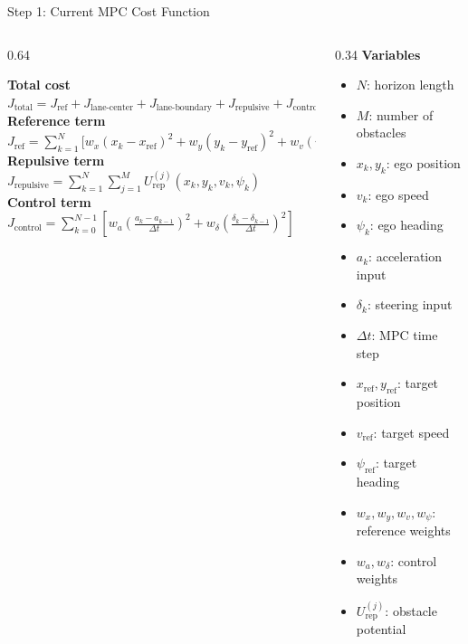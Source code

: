 \documentclass[aspectratio=169]{beamer}
\begin{document}
\begin{frame}{Step 1: Current MPC Cost Function}
\small
\begin{columns}[T,onlytextwidth]
\begin{column}{0.64\textwidth}
\begin{flushleft}
\textbf{Total cost}\\[0.3em]
$\displaystyle
J_{\mathrm{total}}
=
J_{\mathrm{ref}}
+
J_{\mathrm{lane\mbox{-}center}}
+
J_{\mathrm{lane\mbox{-}boundary}}
+
J_{\mathrm{repulsive}}
+
J_{\mathrm{control}}
$\\[0.8em]

\textbf{Reference term}\\[0.3em]
$\displaystyle
J_{\mathrm{ref}}
=
\sum_{k=1}^{N}
\Big[
w_x(x_k-x_{\mathrm{ref}})^2
+
w_y(y_k-y_{\mathrm{ref}})^2
+
w_v(v_k-v_{\mathrm{ref}})^2
+
w_\psi(\psi_k-\psi_{\mathrm{ref}})^2
\Big]
$\\[0.8em]

\textbf{Repulsive term}\\[0.3em]
$\displaystyle
J_{\mathrm{repulsive}}
=
\sum_{k=1}^{N}\sum_{j=1}^{M}
U_{\mathrm{rep}}^{(j)}(x_k,y_k,v_k,\psi_k)
$\\[0.8em]

\textbf{Control term}\\[0.3em]
$\displaystyle
J_{\mathrm{control}}
=
\sum_{k=0}^{N-1}
\left[
w_a\!\left(\frac{a_k-a_{k-1}}{\Delta t}\right)^2
+
w_\delta\!\left(\frac{\delta_k-\delta_{k-1}}{\Delta t}\right)^2
\right]
$\\
\end{flushleft}
\end{column}

\begin{column}{0.34\textwidth}
\textbf{Variables}
\begin{itemize}
\item $N$: horizon length
\item $M$: number of obstacles
\item $x_k,y_k$: ego position
\item $v_k$: ego speed
\item $\psi_k$: ego heading
\item $a_k$: acceleration input
\item $\delta_k$: steering input
\item $\Delta t$: MPC time step
\item $x_{\mathrm{ref}},y_{\mathrm{ref}}$: target position
\item $v_{\mathrm{ref}}$: target speed
\item $\psi_{\mathrm{ref}}$: target heading
\item $w_x,w_y,w_v,w_\psi$: reference weights
\item $w_a,w_\delta$: control weights
\item $U_{\mathrm{rep}}^{(j)}$: obstacle potential
\end{itemize}
\end{column}
\end{columns}
\end{frame}
\end{document}
